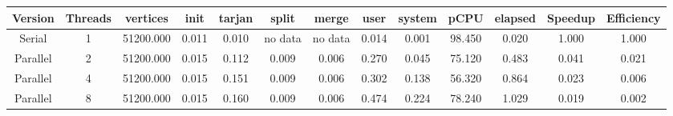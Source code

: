 \begin{tabular}{|c|c|c|c|c|c|c|c|c|c|c|c|c|}
\toprule
 Version &  Threads &  vertices &  init &  tarjan &   split &   merge &  user &  system &   pCPU &  elapsed &  Speedup &  Efficiency \\
\midrule
  Serial &        1 & 51200.000 & 0.011 &   0.010 & no data & no data & 0.014 &   0.001 & 98.450 &    0.020 &    1.000 &       1.000 \\
Parallel &        2 & 51200.000 & 0.015 &   0.112 &   0.009 &   0.006 & 0.270 &   0.045 & 75.120 &    0.483 &    0.041 &       0.021 \\
Parallel &        4 & 51200.000 & 0.015 &   0.151 &   0.009 &   0.006 & 0.302 &   0.138 & 56.320 &    0.864 &    0.023 &       0.006 \\
Parallel &        8 & 51200.000 & 0.015 &   0.160 &   0.009 &   0.006 & 0.474 &   0.224 & 78.240 &    1.029 &    0.019 &       0.002 \\
\bottomrule
\end{tabular}
